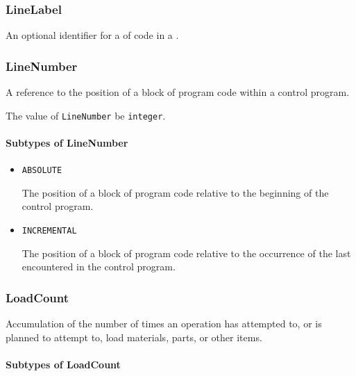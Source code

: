 \subsubsection{LineLabel}
\label{sec:LineLabel}



An optional identifier for a  of code in a .



\subsubsection{LineNumber}
\label{sec:LineNumber}



A reference to the position of a block of program code within a control program.


The value of \texttt{LineNumber} \MUST be \texttt{integer}.


\paragraph{Subtypes of LineNumber}\mbox{}
\label{sec:Subtypes of LineNumber}

\begin{itemize}

\item \texttt{ABSOLUTE}


The position of a block of program code relative to the beginning of the control program.

\item \texttt{INCREMENTAL}


The position of a block of program code relative to the occurrence of the last  encountered in the control program.


\end{itemize}





\subsubsection{LoadCount}
\label{sec:LoadCount}



Accumulation of the number of times an operation has attempted to, or is planned to attempt to, load materials, parts, or other items.


\paragraph{Subtypes of LoadCount}\mbox{}
\label{sec:Subtypes of LoadCount}

